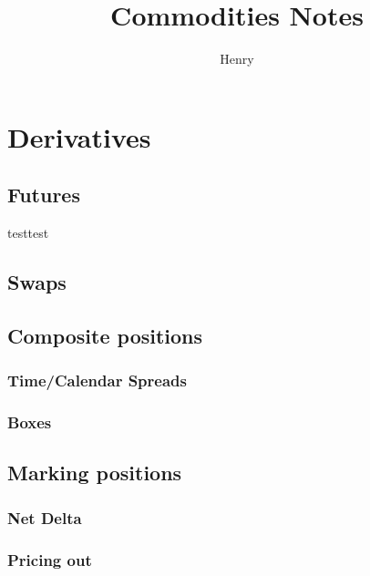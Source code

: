\documentclass{article}
\title{Commodities Notes}
\author{Henry}
\begin{document}
\maketitle


\tableofcontents


\section{Derivatives}
\subsection{Futures}
testtest
\subsection{Swaps}


\subsection{Composite positions}

\subsubsection{Time/Calendar Spreads}
\subsubsection{Boxes}


\subsection{Marking positions}

\subsubsection{Net Delta}
\subsubsection{Pricing out}
\end{document}
